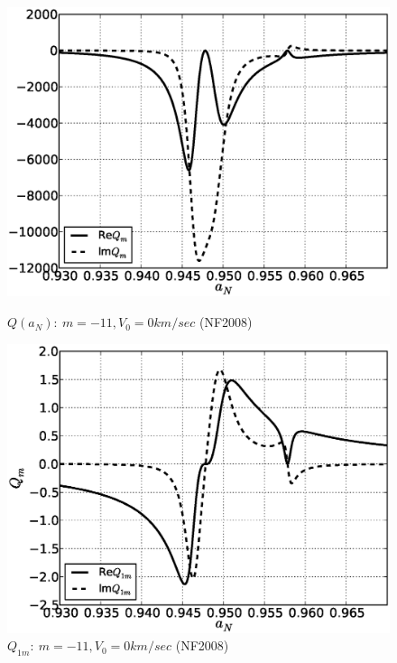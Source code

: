 \documentclass[11pt,oneside,a4paper,notitlepage]{article}
\begin{document}
\begin{figure}[h]
\begin{center}
\begin{minipage}[h]{0.4\linewidth}
 \includegraphics[width=1.35\linewidth]{Q.eps}
 \caption{$Q(a_N):~m=-11,V_{0}=0km/sec$ (NF2008)}
 \label{fig:Q}
\end{minipage}
\hfill
\begin{minipage}[h]{0.4\linewidth}
 \includegraphics[width=1.35\linewidth]{Q1.eps}
 \caption{$Q_{1m}:~m=-11,V_{0}=0km/sec$ (NF2008)}
 \label{fig:Q1}
\end{minipage}
\end{center}
\end{figure}
\end{document}
